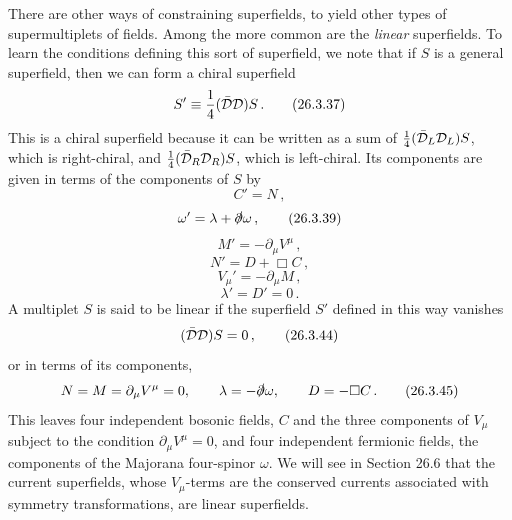 There are other ways of constraining superfields, to yield other types of
supermultiplets of fields. Among the more common are the \emph{linear}
superfields. To learn the conditions defining this sort of superfield, we note
that if $S$ is a general superfield, then we can form a chiral superfield
\begin{equation}
  S'\equiv\frac14(\bar{\SuperD}\SuperD)S\,.
  \tag{26.3.37}\label{eq:26.3.37}
\end{equation}
This is a chiral superfield because it can be written as a sum of
$\frac14(\bar{\SuperD}_L\SuperD_L)S$, which is right-chiral, and
$\frac14(\bar{\SuperD}_R\SuperD_R)S$, which is left-chiral. Its components are
given in terms of the components of $S$ by
\begin{equation}
  C'=N\,,
  \tag{26.3.38}\label{eq:26.3.38}
\end{equation}
\begin{equation}
  \omega'=\lambda+\sl{\partial}\omega\,,
  \tag{26.3.39}\label{eq:26.3.39}
\end{equation}
\begin{equation}
  M'=-\partial_\mu V^\mu\,,
  \tag{26.3.40}\label{eq:26.3.40}
\end{equation}
\begin{equation}
  N'=D+\Box C\,,
  \tag{26.3.41}\label{eq:26.3.41}
\end{equation}
\begin{equation}
  V_\mu'=-\partial_\mu M\,,
  \tag{26.3.42}\label{eq:26.3.42}
\end{equation}
\begin{equation}
  \lambda'=D'=0\,.
  \tag{26.3.43}\label{eq:26.3.43}
\end{equation}
A multiplet $S$ is said to be linear if the superfield $S'$ defined in this
way vanishes
\begin{equation}
  (\bar{\SuperD}\SuperD)S=0\,,
  \tag{26.3.44}\label{eq:26.3.44}
\end{equation}
or in terms of its components,
\begin{equation}
  N=M=\partial_\mu V^\mu=0,\qquad
  \lambda=-\sl{\partial}\omega,\qquad
  D=-\Box C\,.
  \tag{26.3.45}\label{eq:26.3.45}
\end{equation}
This leaves four independent bosonic fields, $C$ and the three components of
$V_\mu$ subject to the condition $\partial_\mu V^\mu=0$, and four independent
fermionic fields, the components of the Majorana four-spinor $\omega$. We
will see in Section 26.6 that the current superfields, whose $V_\mu$-terms are
the conserved currents associated with symmetry transformations, are linear
superfields.
